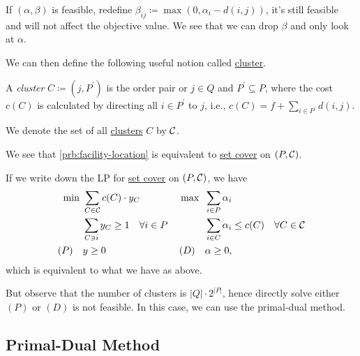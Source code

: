 \begin{remark}
	If \((\alpha , \beta )\) is feasible, redefine \(\beta _{ij} \coloneqq \max (0, \alpha _i - d(i, j))\), it's still feasible and will not affect the objective value. We see that we can drop \(\beta\) and only look at \(\alpha \).
\end{remark}

We can then define the following useful notion called \hyperref[def:cluster]{cluster}.

\begin{definition}[Cluster]\label{def:cluster}
	A \emph{cluster} \(C \coloneqq (j, P^\prime )\) is the order pair or \(j\in Q\) and \(P^\prime \subseteq P\), where the cost \(c(C)\) is calculated by directing all \(i\in P^\prime \) to \(j\), i.e., \(c(C) = f + \sum_{i\in P^\prime }d(i, j)\).
\end{definition}

\begin{notation}
	We denote the set of all \hyperref[def:cluster]{clusters} \(C\) by \(\mathcal{\MakeUppercase{C}} \).
\end{notation}

\begin{remark}
	We see that \autoref{prb:facility-location} is equivalent to \hyperref[prb:set-cover]{set cover} on \((P, \mathcal{\MakeUppercase{C}} )\).
\end{remark}
\begin{explanation}
	If we write down the LP for \hyperref[prb:set-cover]{set cover} on \((P, \mathcal{\MakeUppercase{C}} )\), we have
	\[
		\begin{alignedat}{5}
			\min~&\sum_{C\in \mathcal{\MakeUppercase{C}} } c(C)\cdot y_C\qquad\qquad&&\max ~&&\sum_{i\in P}\alpha _i\\
			& \sum_{C\ni i}y_C  \geq 1 \quad \forall i\in P 				&&		&&\sum_{i\in C} \alpha _{i} \leq c(C)\quad \forall C\in \mathcal{\MakeUppercase{C}}  \\
			(P)\quad	&y\geq  0 	&&(D)\quad&& \alpha \geq 0,
		\end{alignedat}
	\]
	which is equivalent to what we have as above.
\end{explanation}

But observe that the number of clusters is \(\left\vert Q \right\vert \cdot 2^{\left\vert P \right\vert }\), hence directly solve either \((P)\) or \((D)\) is not feasible. In this case, we can use the primal-dual method.

\subsection{Primal-Dual Method}

